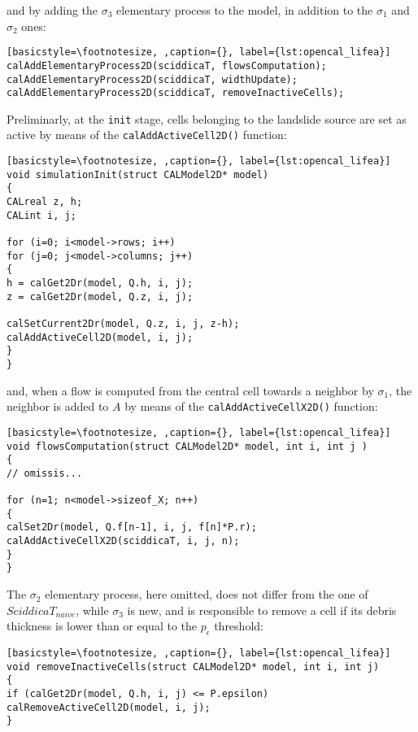 \noindent and by adding the $\sigma_3$ elementary process to the
model, in addition to the $\sigma_1$ and $\sigma_2$ ones:

\begin{lstlisting}[basicstyle=\footnotesize, ,caption={}, label={lst:opencal_lifea}]
calAddElementaryProcess2D(sciddicaT, flowsComputation);
calAddElementaryProcess2D(sciddicaT, widthUpdate);
calAddElementaryProcess2D(sciddicaT, removeInactiveCells);
\end{lstlisting}

Preliminarly, at the \texttt{init} stage, cells belonging to the landslide
source are set as active by means of the
\verb'calAddActiveCell2D()' function:
\begin{lstlisting}[basicstyle=\footnotesize, ,caption={}, label={lst:opencal_lifea}]
void simulationInit(struct CALModel2D* model)
{        
CALreal z, h;
CALint i, j;

for (i=0; i<model->rows; i++)
for (j=0; j<model->columns; j++)
{
h = calGet2Dr(model, Q.h, i, j);
z = calGet2Dr(model, Q.z, i, j);

calSetCurrent2Dr(model, Q.z, i, j, z-h);
calAddActiveCell2D(model, i, j);
}
}
\end{lstlisting}

\noindent and, when a flow is computed from the central cell
towards a neighbor by $\sigma_1$, the neighbor is added to $A$ by
means of the \verb'calAddActiveCellX2D()' function:

\begin{lstlisting}[basicstyle=\footnotesize, ,caption={}, label={lst:opencal_lifea}]
void flowsComputation(struct CALModel2D* model, int i, int j )
{
// omissis...

for (n=1; n<model->sizeof_X; n++)
{
calSet2Dr(model, Q.f[n-1], i, j, f[n]*P.r);
calAddActiveCellX2D(sciddicaT, i, j, n);
}
}
\end{lstlisting}

\noindent The $\sigma_2$ elementary process, here omitted, does
not differ from the one of $SciddicaT_{naive}$, while $\sigma_3$
is new, and is responsible to remove a cell if its debris
thickness is lower than or equal to the $p_\epsilon$ threshold:

\begin{lstlisting}[basicstyle=\footnotesize, ,caption={}, label={lst:opencal_lifea}]
void removeInactiveCells(struct CALModel2D* model, int i, int j)
{
if (calGet2Dr(model, Q.h, i, j) <= P.epsilon)
calRemoveActiveCell2D(model, i, j);
}
\end{lstlisting}

